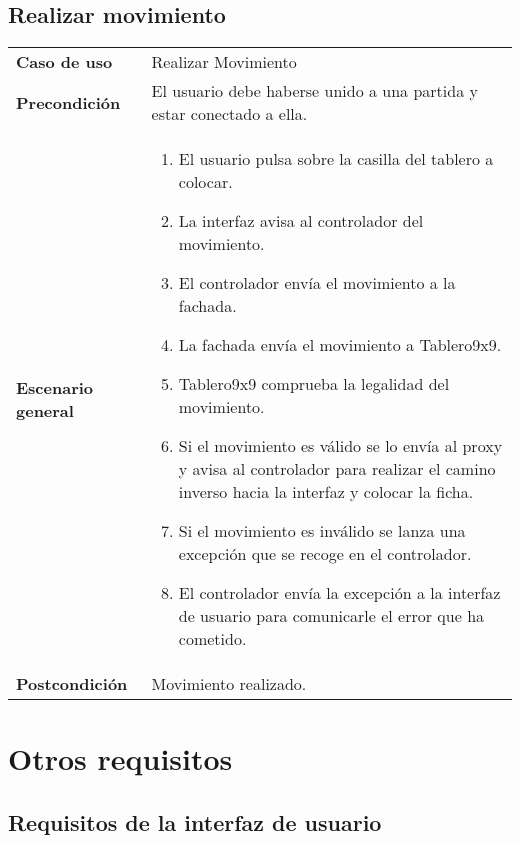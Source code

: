 \subsection{Realizar movimiento}

{\footnotesize
\begin{tabularx}{0.95\textwidth}{p{}|X}

\textbf{Caso de uso} & Realizar Movimiento \\

\textbf{Precondición} & El usuario debe haberse unido a una partida y estar
conectado a ella. \\

\textbf{Escenario general} & \begin{enumerate}
\item El usuario pulsa sobre la casilla del tablero a colocar.
\item La interfaz avisa al controlador del movimiento.
\item El controlador envía el movimiento a la fachada.
\item La fachada envía el movimiento a Tablero9x9.
\item Tablero9x9 comprueba la legalidad del movimiento.
\item Si el movimiento es válido se lo envía al proxy y avisa al controlador para realizar el camino inverso hacia la interfaz y colocar la ficha.
\item Si el movimiento es inválido se lanza una excepción que se recoge en el controlador.
\item El controlador envía la excepción a la interfaz de usuario para comunicarle el error que ha cometido.
\end{enumerate} \\
\textbf{Postcondición} & Movimiento realizado. \\
\end{tabularx}
}



\section{Otros requisitos}
\subsection{Requisitos de la interfaz de usuario}
